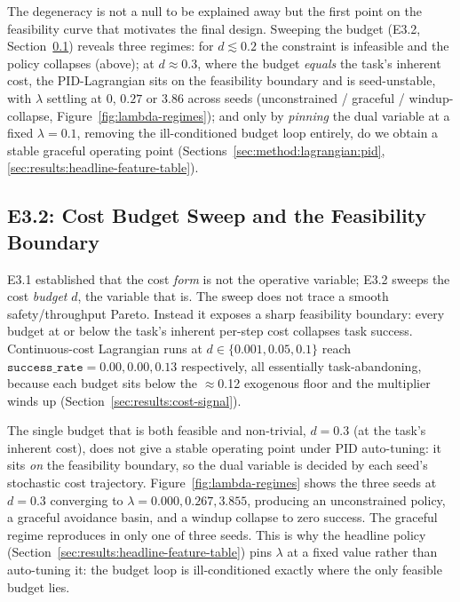 \documentclass[11pt,a4paper]{report}
\begin{document}
The degeneracy is not a null to be explained away but the first point
on the feasibility curve that motivates the final design. Sweeping the
budget (E3.2, Section~\ref{sec:results:budget}) reveals three regimes:
for $d \lesssim 0.2$ the constraint is infeasible and the policy
collapses (above); at $d \approx 0.3$, where the budget \emph{equals}
the task's inherent cost, the PID-Lagrangian sits on the feasibility
boundary and is seed-unstable, with $\lambda$ settling at $0$, $0.27$
or $3.86$ across seeds (unconstrained / graceful / windup-collapse,
Figure~\ref{fig:lambda-regimes}); and only by \emph{pinning} the dual
variable at a fixed $\lambda = 0.1$, removing the ill-conditioned
budget loop entirely, do we obtain a stable graceful operating point
(Sections~\ref{sec:method:lagrangian:pid},
\ref{sec:results:headline-feature-table}).

\subsection{E3.2: Cost Budget Sweep and the Feasibility Boundary}
\label{sec:results:budget}

E3.1 established that the cost \emph{form} is not the operative
variable; E3.2 sweeps the cost \emph{budget} $d$, the variable that
is. The sweep does not trace a smooth safety/throughput Pareto.
Instead it exposes a sharp feasibility boundary: every budget at or
below the task's inherent per-step cost collapses task success.
Continuous-cost Lagrangian runs at $d \in \{0.001, 0.05, 0.1\}$ reach
$\texttt{success\_rate} = 0.00, 0.00, 0.13$ respectively, all
essentially task-abandoning, because each budget sits below the
$\approx$0.12 exogenous floor and the multiplier winds up
(Section~\ref{sec:results:cost-signal}).

The single budget that is both feasible and non-trivial, $d = 0.3$
(at the task's inherent cost), does not give a stable operating point
under PID auto-tuning: it sits \emph{on} the feasibility boundary, so
the dual variable is decided by each seed's stochastic cost
trajectory. Figure~\ref{fig:lambda-regimes} shows the three seeds at
$d = 0.3$ converging to $\lambda = 0.000, 0.267, 3.855$, producing an
unconstrained policy, a graceful avoidance basin, and a windup
collapse to zero success. The graceful regime reproduces in only one
of three seeds. This is why the headline policy
(Section~\ref{sec:results:headline-feature-table}) pins $\lambda$ at a
fixed value rather than auto-tuning it: the budget loop is
ill-conditioned exactly where the only feasible budget lies.
\end{document}
